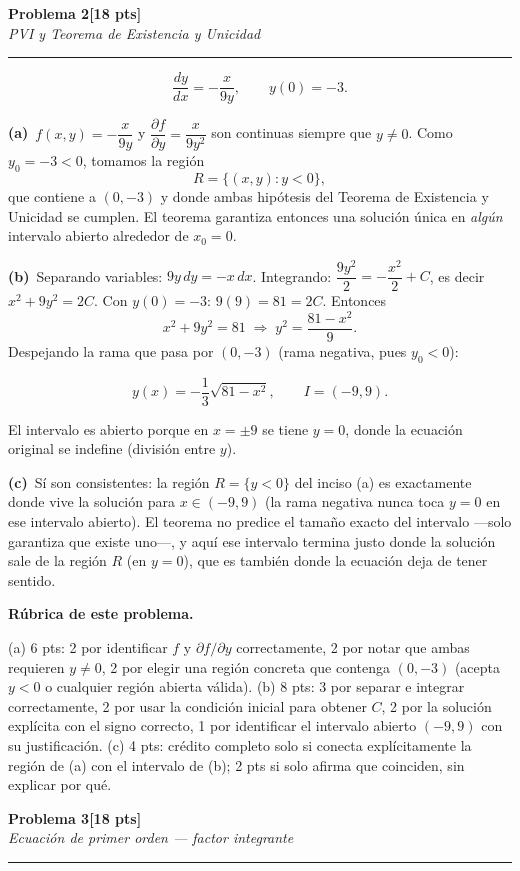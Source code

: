 \documentclass[11pt,letterpaper]{article}
\newcommand{\problema}[3]{%
  \bigskip\bigskip\noindent
  {\Large\textbf{Problema #1}}\hfill\textbf{[#2 pts]}\\[3pt]
  {\small\itshape #3}\par
  \vspace{2pt}\hrule\vspace{8pt}
}
\newcommand{\subparte}[2]{%
  \medskip\noindent\textbf{(#1}\ #2\par\smallskip
}
\newenvironment{resultado}
  {\begin{mdframed}[linecolor=black,linewidth=0.6pt,
    innerleftmargin=6pt,innerrightmargin=6pt,innertopmargin=4pt,innerbottommargin=4pt]
   \bfseries}
  {\end{mdframed}}
\newenvironment{rubrica}{%
  \begin{mdframed}[linecolor=black,linewidth=0.6pt,
    innerleftmargin=8pt,innerrightmargin=8pt,innertopmargin=5pt,innerbottommargin=5pt]
  \small\textbf{Rúbrica de este problema.}\par\smallskip
}{\end{mdframed}}
\begin{document}
\newpage
\problema{2}{18}{PVI y Teorema de Existencia y Unicidad}

\[
\frac{dy}{dx} = -\frac{x}{9y}, \qquad y(0)=-3.
\]

\subparte{a)}{$f(x,y) = -\dfrac{x}{9y}$ y $\dfrac{\partial f}{\partial y} = \dfrac{x}{9y^2}$ son continuas siempre que $y \neq 0$. Como $y_0 = -3 < 0$, tomamos la región
\[
R = \{(x,y) : y < 0\},
\]
que contiene a $(0,-3)$ y donde ambas hipótesis del Teorema de Existencia y Unicidad se cumplen. El teorema garantiza entonces una solución única en \emph{algún} intervalo abierto alrededor de $x_0=0$.}

\subparte{b)}{Separando variables: $9y\,dy = -x\,dx$. Integrando: $\dfrac{9y^2}{2} = -\dfrac{x^2}{2} + C$, es decir $x^2 + 9y^2 = 2C$. Con $y(0)=-3$: $9(9) = 81 = 2C$. Entonces
\[
x^2 + 9y^2 = 81 \;\Longrightarrow\; y^2 = \frac{81-x^2}{9}.
\]
Despejando la rama que pasa por $(0,-3)$ (rama negativa, pues $y_0<0$):
\begin{resultado}
\[
y(x) = -\frac{1}{3}\sqrt{81-x^2}, \qquad I = (-9,9).
\]
\end{resultado}
El intervalo es abierto porque en $x=\pm 9$ se tiene $y=0$, donde la ecuación original se indefine (división entre $y$).}

\subparte{c)}{Sí son consistentes: la región $R=\{y<0\}$ del inciso (a) es exactamente donde vive la solución para $x\in(-9,9)$ (la rama negativa nunca toca $y=0$ en ese intervalo abierto). El teorema no predice el tamaño exacto del intervalo —solo garantiza que existe uno—, y aquí ese intervalo termina justo donde la solución sale de la región $R$ (en $y=0$), que es también donde la ecuación deja de tener sentido.}

\begin{rubrica}
(a) 6 pts: 2 por identificar $f$ y $\partial f/\partial y$ correctamente, 2 por notar que ambas requieren $y\neq0$, 2 por elegir una región concreta que contenga $(0,-3)$ (acepta $y<0$ o cualquier región abierta válida). (b) 8 pts: 3 por separar e integrar correctamente, 2 por usar la condición inicial para obtener $C$, 2 por la solución explícita con el signo correcto, 1 por identificar el intervalo abierto $(-9,9)$ con su justificación. (c) 4 pts: crédito completo solo si conecta explícitamente la región de (a) con el intervalo de (b); 2 pts si solo afirma que coinciden, sin explicar por qué.
\end{rubrica}

\problema{3}{18}{Ecuación de primer orden — factor integrante}
\end{document}
